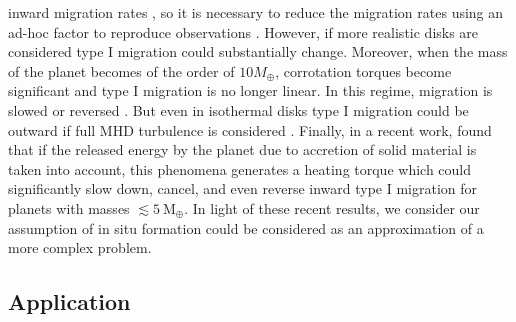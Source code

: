 \documentclass{aa}
\begin{document}
inward migration rates \citep{Tanaka2002}, so it is necessary to reduce the migration rates using an ad-hoc factor to reproduce observations \citep{Alibert2005, Ida2008, Miguel2011a, Miguel2011b}. However, if more realistic disks are considered \citep{Kley2008, Paardekooper2010, Paardekooper2011} type I migration could substantially change.
Moreover, when the mass of the planet becomes of the order of $10 M_{\oplus}$,
corrotation torques become significant and type
I migration is no longer linear. In this regime, migration is slowed or reversed \citep{Masset2006, Dittkrist2014}.
But even in isothermal
disks type I migration could be outward if full MHD turbulence is considered \citep{Guilet2013}. Finally, in a recent work,
\citep{Benitez-Llambay2015} found that if the released energy by the planet due to
accretion of solid material is taken into account, this phenomena generates a heating torque which could significantly slow down,
cancel, and even reverse inward type I migration for planets with masses $\lesssim 5~\textrm{M}_{\oplus}$. 
In light of these recent results, we consider our assumption of in situ formation could be considered as an approximation of a
more complex problem.

\subsection{Application}
\label{section_semianalitical_model_application}
\end{document}
